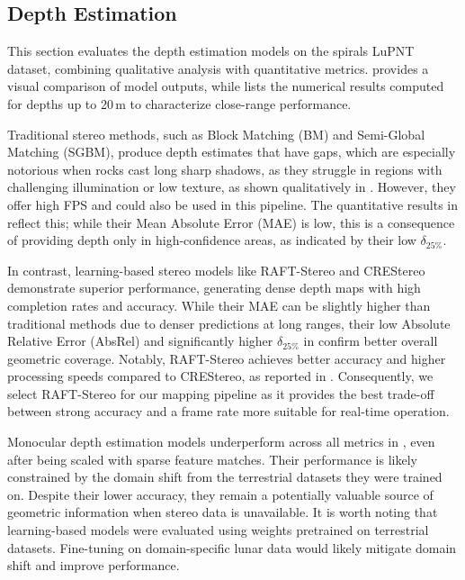 \subsection{Depth Estimation}
This section evaluates the depth estimation models on the spirals LuPNT dataset, combining qualitative analysis with quantitative metrics.  provides a visual comparison of model outputs, while  lists the numerical results computed for depths up to 20\,m to characterize close-range performance.

Traditional stereo methods, such as Block Matching (BM) and Semi-Global Matching (SGBM), produce depth estimates that have gaps, which are especially notorious when rocks cast long sharp shadows, as they struggle in regions with challenging illumination or low texture, as shown qualitatively in . However, they offer high FPS and could also be used in this pipeline. The quantitative results in  reflect this; while their Mean Absolute Error (MAE) is low, this is a consequence of providing depth only in high-confidence areas, as indicated by their low $\delta_{25\%}$.

In contrast, learning-based stereo models like RAFT-Stereo and CREStereo demonstrate superior performance, generating dense depth maps with high completion rates and accuracy. While their MAE can be slightly higher than traditional methods due to denser predictions at long ranges, their low Absolute Relative Error (AbsRel) and significantly higher $\delta_{25\%}$ in  confirm better overall geometric coverage. Notably, RAFT-Stereo achieves better accuracy and higher processing speeds compared to CREStereo, as reported in . Consequently, we select RAFT-Stereo for our mapping pipeline as it provides the best trade-off between strong accuracy and a frame rate more suitable for real-time operation.

Monocular depth estimation models underperform across all metrics in , even after being scaled with sparse feature matches. Their performance is likely constrained by the domain shift from the terrestrial datasets they were trained on. Despite their lower accuracy, they remain a potentially valuable source of geometric information when stereo data is unavailable.
It is worth noting that learning-based models were evaluated using weights pretrained on terrestrial datasets. Fine-tuning on domain-specific lunar data would likely mitigate domain shift and improve performance.

